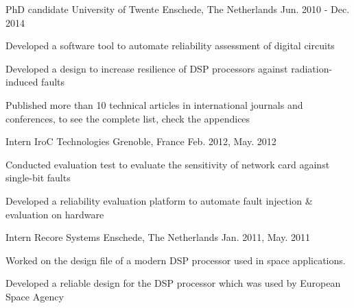 \begin{cventries}
  \cventry
    {PhD candidate} %
    {University of Twente} %
    {Enschede, The Netherlands} %
    {Jun. 2010 - Dec. 2014} %
    {
      \begin{cvitems} %
	\item {Developed a software tool to automate reliability assessment of digital circuits}
        \item {Developed a design to increase resilience of DSP processors against radiation-induced faults}
	\item{Published more than 10 technical articles in international journals and conferences, to see the complete list, check the appendices}
      \end{cvitems}
    }

  \cventry
    {Intern} %
    {IroC Technologies} %
    {Grenoble, France} %
    {Feb. 2012, May. 2012} %
    {
      \begin{cvitems} %
        \item {Conducted evaluation test to evaluate the sensitivity of network card against single-bit faults}
        \item {Developed a reliability evaluation platform to automate fault injection \&  evaluation on hardware}
	\end{cvitems}
	}

  \cventry
    {Intern} %
    {Recore Systems} %
    {Enschede, The Netherlands} %
    {Jan. 2011, May. 2011} %
    {
      \begin{cvitems} %
        \item {Worked on the design file of a modern DSP processor used in space applications.}
        \item {Developed a reliable design for the DSP processor which was used by European Space Agency}
      \end{cvitems}
    }

\end{cventries}
